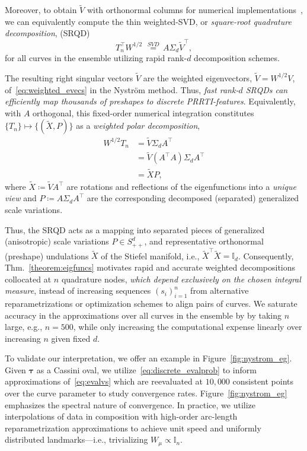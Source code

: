 \documentclass[pdflatex,iicol]{sn-jnl}%
\theoremstyle{thmstyleone}%
\theoremstyle{thmstyletwo}%
\theoremstyle{thmstylethree}%
\begin{document}
Moreover, to obtain $\widetilde{V}$ with orthonormal columns for numerical implementations~\cite{grey2023separable}, we can equivalently compute the thin weighted-SVD, or \textit{square-root quadrature decomposition}, (SRQD)
\begin{equation} \label{eq:SRQD}
    T_n^{\top}W^{1/2}\,\,\overset{SVD}{=}\, A\Sigma_d\widetilde{V}^{\top},
\end{equation}
for all curves in the ensemble utilizing rapid rank-$d$ decomposition schemes. 

The resulting right singular vectors $\widetilde{V}$ are the weighted eigenvectors, $\widetilde{V} = W^{1/2}V$, of~\eqref{eq:weighted_evecs} in the Nystr\"om method. Thus, \textit{fast rank-$d$ SRQDs can efficiently map thousands of preshapes to discrete PRRTI-features}. Equivalently, with $A$ orthogonal, this fixed-order numerical integration constitutes $\lbrace T_n \rbrace \mapsto \lbrace (\widetilde{X}, P)\rbrace$ as a \textit{weighted polar decomposition}, 
\begin{align} \label{eq:derived_polar_decomp}
    W^{1/2}T_n &= \widetilde{V} \Sigma_dA^{\top}\\ \nonumber
    & = \widetilde{V}(A^{\top}A)\Sigma_dA^{\top}\\ \nonumber
    &=\widetilde{X}P, \nonumber
\end{align}
where $\widetilde{X} \coloneqq \widetilde{V}A^{\top}$ are rotations and reflections of the eigenfunctions into a \textit{unique view} and $P \coloneqq A \Sigma_dA^{\top}$ are the corresponding decomposed (separated) generalized scale variations. 

Thus, the SRQD acts as a mapping into separated pieces of generalized (anisotropic) scale variations $P \in S^d_{++}$, and representative orthonormal (preshape) undulations $\widetilde{X}$ of the Stiefel manifold, i.e., $\widetilde{X}^{\top}\widetilde{X} = \mathbb{I}_d$. Consequently, Thm.~\ref{theorem:eigfuncs} motivates rapid and accurate weighted decompositions collocated at $n$ quadrature nodes, \textit{which depend exclusively on the chosen integral measure}, instead of increasing sequences $(s_i)_{i=1}^n$ from alternative reparametrizations or optimization schemes to align pairs of curves. We saturate accuracy in the approximations over all curves in the ensemble by by taking $n$ large, e.g., $n = 500$, while only increasing the computational expense linearly over increasing $n$ given fixed $d$.

To validate our interpretation, we offer an example in Figure~\ref{fig:nystrom_eg}. Given $\boldsymbol{\tau}$ as a Cassini oval, we utilize~\eqref{eq:discrete_evalprob} to inform approximations of~\eqref{eq:evalvs} which are reevaluated at $10,000$ consistent points over the curve parameter to study convergence rates. Figure~\eqref{fig:nystrom_eg} emphasizes the spectral nature of convergence. In practice, we utilize interpolations of data in composition with high-order arc-length reparametrization approximations to achieve unit speed and uniformly distributed landmarks---i.e., trivializing $W_\mu \propto \mathbb{I}_n$. 
\end{document}
